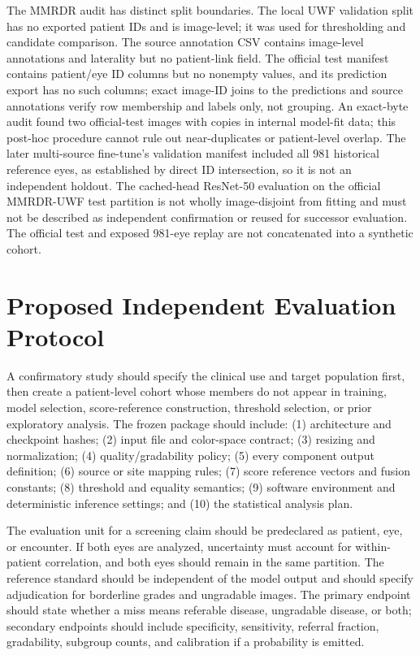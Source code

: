 \documentclass{ieeeaccess}
\begin{document}
The MMRDR audit has distinct split boundaries. The local UWF validation split has no exported patient IDs and is image-level; it was used for thresholding and candidate comparison. The source annotation CSV contains image-level annotations and laterality but no patient-link field. The official test manifest contains patient/eye ID columns but no nonempty values, and its prediction export has no such columns; exact image-ID joins to the predictions and source annotations verify row membership and labels only, not grouping. An exact-byte audit found two official-test images with copies in internal model-fit data; this post-hoc procedure cannot rule out near-duplicates or patient-level overlap. The later multi-source fine-tune's validation manifest included all 981 historical reference eyes, as established by direct ID intersection, so it is not an independent holdout. The cached-head ResNet-50 evaluation on the official MMRDR-UWF test partition is not wholly image-disjoint from fitting and must not be described as independent confirmation or reused for successor evaluation. The official test and exposed 981-eye replay are not concatenated into a synthetic cohort.

\section{Proposed Independent Evaluation Protocol}
A confirmatory study should specify the clinical use and target population first, then create a patient-level cohort whose members do not appear in training, model selection, score-reference construction, threshold selection, or prior exploratory analysis. The frozen package should include: (1) architecture and checkpoint hashes; (2) input file and color-space contract; (3) resizing and normalization; (4) quality/gradability policy; (5) every component output definition; (6) source or site mapping rules; (7) score reference vectors and fusion constants; (8) threshold and equality semantics; (9) software environment and deterministic inference settings; and (10) the statistical analysis plan.

The evaluation unit for a screening claim should be predeclared as patient, eye, or encounter. If both eyes are analyzed, uncertainty must account for within-patient correlation, and both eyes should remain in the same partition. The reference standard should be independent of the model output and should specify adjudication for borderline grades and ungradable images. The primary endpoint should state whether a miss means referable disease, ungradable disease, or both; secondary endpoints should include specificity, sensitivity, referral fraction, gradability, subgroup counts, and calibration if a probability is emitted.
\end{document}
